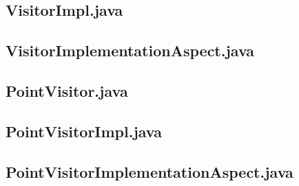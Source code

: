 \subsection{VisitorImpl.java}


\subsection{VisitorImplementationAspect.java}


\subsection{PointVisitor.java}


\subsection{PointVisitorImpl.java}


\subsection{PointVisitorImplementationAspect.java}
